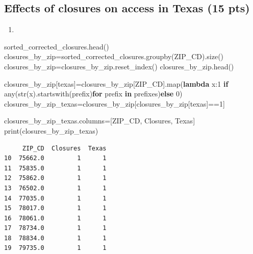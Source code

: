 \documentclass[
  letterpaper,
  DIV=11,
  numbers=noendperiod]{scrartcl}
\newenvironment{Shaded}{\begin{snugshade}}{\end{snugshade}}
\newcommand{\BuiltInTok}[1]{\textcolor[rgb]{0.00,0.23,0.31}{#1}}
\newcommand{\ControlFlowTok}[1]{\textcolor[rgb]{0.00,0.23,0.31}{\textbf{#1}}}
\newcommand{\DecValTok}[1]{\textcolor[rgb]{0.68,0.00,0.00}{#1}}
\newcommand{\KeywordTok}[1]{\textcolor[rgb]{0.00,0.23,0.31}{\textbf{#1}}}
\newcommand{\NormalTok}[1]{\textcolor[rgb]{0.00,0.23,0.31}{#1}}
\newcommand{\OperatorTok}[1]{\textcolor[rgb]{0.37,0.37,0.37}{#1}}
\newcommand{\StringTok}[1]{\textcolor[rgb]{0.13,0.47,0.30}{#1}}
\providecommand{\tightlist}{%
  \setlength{\itemsep}{0pt}\setlength{\parskip}{0pt}}\usepackage{longtable,booktabs,array}
\begin{document}
\subsection{Effects of closures on access in Texas (15
pts)}\label{effects-of-closures-on-access-in-texas-15-pts}

\begin{enumerate}
\def\labelenumi{\arabic{enumi}.}
\tightlist
\item
\end{enumerate}

\begin{Shaded}
\begin{Highlighting}[]
\NormalTok{sorted\_corrected\_closures.head()}
\NormalTok{closures\_by\_zip}\OperatorTok{=}\NormalTok{sorted\_corrected\_closures.groupby(}\StringTok{\textquotesingle{}ZIP\_CD\textquotesingle{}}\NormalTok{).size()}
\NormalTok{closures\_by\_zip}\OperatorTok{=}\NormalTok{closures\_by\_zip.reset\_index()}
\NormalTok{closures\_by\_zip.head()}

\NormalTok{closures\_by\_zip[}\StringTok{\textquotesingle{}texas\textquotesingle{}}\NormalTok{]}\OperatorTok{=}\NormalTok{closures\_by\_zip[}\StringTok{\textquotesingle{}ZIP\_CD\textquotesingle{}}\NormalTok{].}\BuiltInTok{map}\NormalTok{(}\KeywordTok{lambda}\NormalTok{ x:}\DecValTok{1} \ControlFlowTok{if} \BuiltInTok{any}\NormalTok{(}\BuiltInTok{str}\NormalTok{(x).startswith(prefix)}\ControlFlowTok{for}\NormalTok{ prefix }\KeywordTok{in}\NormalTok{ prefixes)}\ControlFlowTok{else} \DecValTok{0}\NormalTok{)}
\NormalTok{closures\_by\_zip\_texas}\OperatorTok{=}\NormalTok{closures\_by\_zip[closures\_by\_zip[}\StringTok{\textquotesingle{}texas\textquotesingle{}}\NormalTok{]}\OperatorTok{==}\DecValTok{1}\NormalTok{]}

\NormalTok{closures\_by\_zip\_texas.columns}\OperatorTok{=}\NormalTok{[}\StringTok{\textquotesingle{}ZIP\_CD\textquotesingle{}}\NormalTok{, }\StringTok{\textquotesingle{}Closures\textquotesingle{}}\NormalTok{, }\StringTok{\textquotesingle{}Texas\textquotesingle{}}\NormalTok{]}
\BuiltInTok{print}\NormalTok{(closures\_by\_zip\_texas)}
\end{Highlighting}
\end{Shaded}

\begin{verbatim}
     ZIP_CD  Closures  Texas
10  75662.0         1      1
11  75835.0         1      1
12  75862.0         1      1
13  76502.0         1      1
14  77035.0         1      1
15  78017.0         1      1
16  78061.0         1      1
17  78734.0         1      1
18  78834.0         1      1
19  79735.0         1      1
\end{verbatim}
\end{document}
